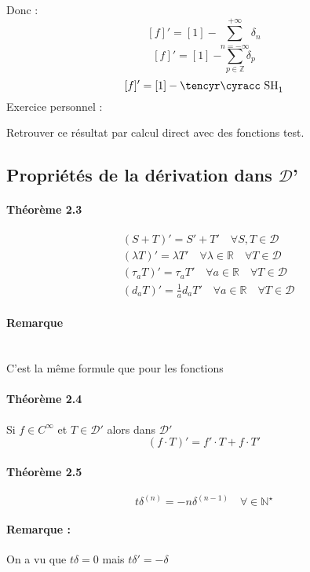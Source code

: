 \documentclass[12pt,a4paper]{report}
\newcommand{\ens}[1]{\ensuremath{\mathbb{#1}}}
\newcommand{\D}{\ensuremath{\mathcal{D}}}
\def\cyr{\tencyr\cyracc}
\def\dc{\mbox{\cyr SH}}
\begin{document}
Donc :
\[
	[f]' = [1] - \sum_{n = -\infty}^{+\infty} \delta_n 
\]
\[
	[f]' = [1] - \sum_{p \in \ens{Z}} \delta_p
\]
\[
	[f]' = [1] - \dc_1
\]
Exercice personnel :

Retrouver ce résultat par calcul direct avec des fonctions test.

\subsection{Propriétés de la dérivation dans \D'}

\paragraph{Théorème 2.3}

\begin{align*}
	&(S+T)' = S'+T' \quad	\forall S,T \in \D\\
	&(\lambda T)' = \lambda T' \quad \forall \lambda \in \ens{R} \quad	\forall T \in \D\\
	&(\tau_a T)' = \tau_a T' \quad \forall a \in \ens{R} \quad	\forall T \in \D\\
	&(d_a T)' = \frac{1}{a}d_aT' \quad \forall a \in \ens{R} \quad	\forall T \in \D
\end{align*}

\paragraph{Remarque} \quad \\

C'est la même formule que pour les fonctions

\paragraph{Théorème 2.4} Si \(f \in C^{\infty}\) et \(T \in \D'\) alors dans \(\D'\)
\[
	(f\cdot T)' = f' \cdot T + f \cdot T'
\]

\paragraph{Théorème 2.5}

\[
	t\delta^{(n)} = -n \delta^{(n-1)} \quad \forall \in \ens{N^\star} 
\]

\paragraph{Remarque :} On a vu que \(t\delta = 0\) mais \(t\delta' = -\delta\)
\end{document}
